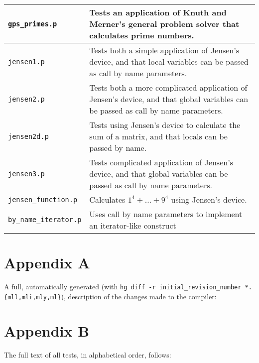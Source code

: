 \documentclass[a4paper,10pt]{article}
\begin{document}
\begin{tabularx}{\linewidth}{ |X|X| }
\hline
    \texttt{gps\_primes.p} & Tests an application of Knuth and Merner's general problem solver that calculates prime numbers. \\
\hline
    \texttt{jensen1.p} & Tests both a simple application of Jensen's device, and that local variables can be passed as call by name parameters. \\
\hline
    \texttt{jensen2.p} & Tests both a more complicated application of Jensen's device, and that global variables can be passed as call by name parameters. \\
\hline
    \texttt{jensen2d.p} & Tests using Jensen's device to calculate the sum of a matrix, and that locals can be passed by name. \\
\hline
    \texttt{jensen3.p} & Tests complicated application of Jensen's device, and that global variables can be passed as call by name parameters. \\
\hline
    \texttt{jensen\_function.p} & Calculates $1^4 + ... + 9^4$ using Jensen's device. \\
\hline
    \texttt{by\_name\_iterator.p} & Uses call by name parameters to implement an iterator-like construct \\
\hline
\end{tabularx}
\section{Appendix A}

\lstset{style=teststyle}
A full, automatically generated (with \texttt{hg diff -r initial\_revision\_number *.\{mll,mli,mly,ml\}}), description of the changes made to the compiler:

\section{Appendix B}

The full text of all tests, in alphabetical order, follows:
\lstset{style=pascal}
\end{document}
